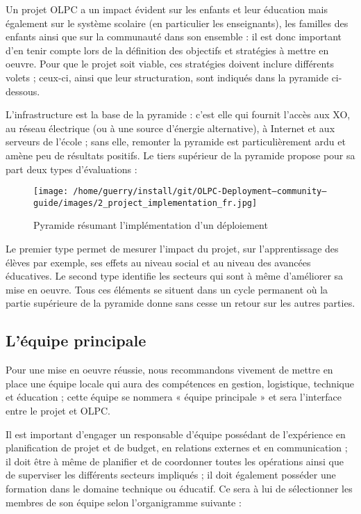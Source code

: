 \documentclass[11pt]{article}
\begin{document}
Un projet OLPC a un impact évident sur les enfants et leur éducation mais
également sur le système scolaire (en particulier les enseignants), les
familles des enfants ainsi que sur la communauté dans son ensemble : il est
donc important d'en tenir compte lors de la définition des objectifs et
stratégies à mettre en oeuvre. Pour que le projet soit viable, ces
stratégies doivent inclure différents volets ; ceux-ci, ainsi que leur
structuration, sont indiqués dans la pyramide ci-dessous.

L'infrastructure est la base de la pyramide : c'est elle qui fournit
l'accès aux XO, au réseau électrique (ou à une source d'énergie
alternative), à Internet et aux serveurs de l'école ; sans elle, remonter
la pyramide est particulièrement ardu et amène peu de résultats
positifs. Le tiers supérieur de la pyramide propose pour sa part deux types
d'évaluations :

\begin{figure}[htb]
\centering
\texttt{[image: /home/guerry/install/git/OLPC-Deployment--community--guide/images/2\_project\_implementation\_fr.jpg]}
\caption{Pyramide résumant l'implémentation d'un déploiement}
\end{figure}

Le premier type permet de mesurer l'impact du projet, sur l'apprentissage
des élèves par exemple, ses effets au niveau social et au niveau des
avancées éducatives. Le second type identifie les secteurs qui sont à même
d'améliorer sa mise en oeuvre. Tous ces éléments se situent dans un cycle
permanent où la partie supérieure de la pyramide donne sans cesse un retour
sur les autres parties.
\subsection{L'équipe principale}
\label{sec-4-1}



Pour une mise en oeuvre réussie, nous recommandons vivement de mettre en
place une équipe locale qui aura des compétences en gestion, logistique,
technique et éducation ; cette équipe se nommera « équipe principale » et
sera l'interface entre le projet et OLPC.

Il est important d'engager un responsable d'équipe possédant de
l'expérience en planification de projet et de budget, en relations externes
et en communication ; il doit être à même de planifier et de coordonner
toutes les opérations ainsi que de superviser les différents secteurs
impliqués ; il doit également posséder une formation dans le domaine
technique ou éducatif. Ce sera à lui de sélectionner les membres de son
équipe selon l'organigramme suivante :
\end{document}

